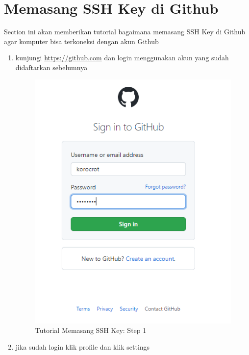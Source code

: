 \section{Memasang SSH Key di Github}
Section ini akan memberikan tutorial bagaimana memasang SSH Key di Github agar komputer bisa terkoneksi dengan akun Github
\begin{enumerate}
\item kunjungi \url{https://github.com} dan login menggunakan akun yang sudah didaftarkan sebelumnya
\begin{figure}[H]
        \centerline{\includegraphics[scale=0.5]{figures/memasang-ssh-key/step1}}
        \caption{Tutorial Memasang SSH Key: Step 1}
\end{figure}
\item jika sudah login klik profile dan klik settings
\begin{figure}[H]

\end{figure}
\end{enumerate}
